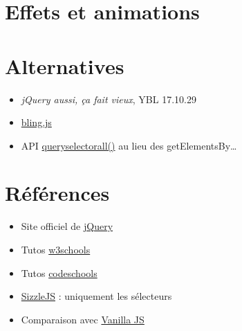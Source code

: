 \hypertarget{effets-et-animations}{%
\section{Effets et animations}\label{effets-et-animations}}


\hypertarget{alternatives}{%
\section{Alternatives}\label{alternatives}}

\begin{itemize}
\tightlist
\item
  \emph{jQuery aussi, ça fait vieux}, YBL 17.10.29
\item
  \href{https://gist.github.com/paulirish/12fb951a8b893a454b32}{bling.js}
\item
  API
  \href{https://www.w3schools.com/jsref/met_document_queryselectorall.asp}{queryselectorall()}
  au lieu des getElementsBy\ldots{}
\end{itemize}

\hypertarget{ruxe9fuxe9rences}{%
\section{Références}\label{ruxe9fuxe9rences}}

\begin{itemize}
\tightlist
\item
  Site officiel de \href{http://jquery.com/}{jQuery}
\item
  Tutos \href{http://www.w3schools.com/jquery/}{w3schools}
\item
  Tutos \href{http://try.jquery.com/}{codeschools}
\item
  \href{http://www.javascriptoo.com/sizzle}{SizzleJS} : uniquement les
  sélecteurs
\item
  Comparaison avec \href{http://vanilla-js.com/}{Vanilla JS}
\end{itemize}

